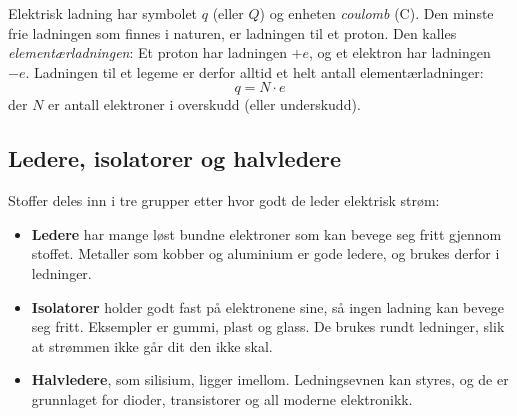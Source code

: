 Elektrisk ladning har symbolet $q$ (eller $Q$) og enheten \emph{coulomb} (\si{\coulomb}). Den minste frie ladningen som finnes i naturen, er ladningen til et proton. Den kalles \emph{elementærladningen}:
Et proton har ladningen $+e$, og et elektron har ladningen $-e$. Ladningen til et legeme er derfor alltid et helt antall elementærladninger:
\[
  q = N\cdot e
\]
der $N$ er antall elektroner i overskudd (eller underskudd).



\subsection*{Ledere, isolatorer og halvledere}

Stoffer deles inn i tre grupper etter hvor godt de leder elektrisk strøm:
\begin{itemize}
  \item \textbf{Ledere} har mange løst bundne elektroner som kan bevege seg fritt gjennom stoffet. Metaller som kobber og aluminium er gode ledere, og brukes derfor i ledninger.
  \item \textbf{Isolatorer} holder godt fast på elektronene sine, så ingen ladning kan bevege seg fritt. Eksempler er gummi, plast og glass. De brukes rundt ledninger, slik at strømmen ikke går dit den ikke skal.
  \item \textbf{Halvledere}, som silisium, ligger imellom. Ledningsevnen kan styres, og de er grunnlaget for dioder, transistorer og all moderne elektronikk.
\end{itemize}

